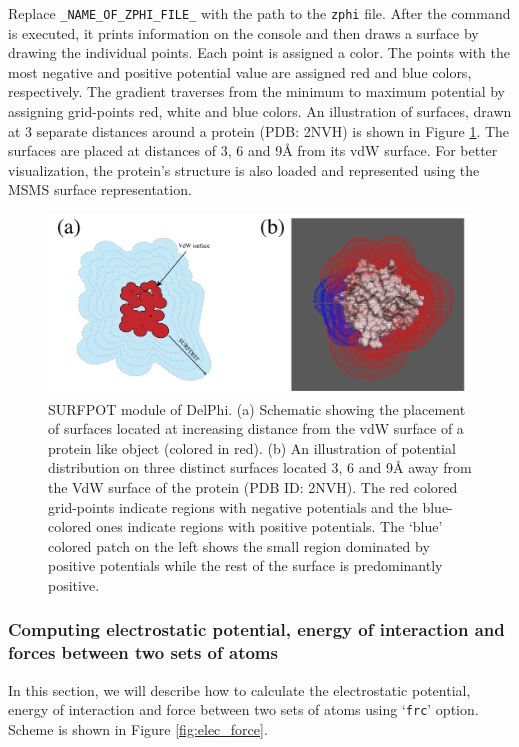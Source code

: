 \documentclass[9pt,tutorial]{livecoms}
\begin{document}
Replace \texttt{\_NAME\_OF\_ZPHI\_FILE\_} with the path to the \texttt{zphi} file. After the command is executed, it prints information on the console and then draws a surface by drawing the individual points. Each point is assigned a color. The points with the most negative and positive potential value are assigned red and blue colors, respectively. The gradient traverses from the minimum to maximum potential by assigning grid-points red, white and blue colors. An illustration of surfaces, drawn at 3 separate distances around a protein (PDB: 2NVH) is shown in Figure \ref{fig:zeta-potential}. The surfaces are placed at distances of 3, 6 and 9Å from its vdW surface. For better visualization, the protein’s structure is also loaded and represented using the MSMS surface representation. 

\begin{figure}
\includegraphics[width=0.95\linewidth]{Figure_9.png}
\caption{SURFPOT module of DelPhi. (a) Schematic showing the placement of surfaces located at increasing distance from the vdW surface of a protein like object (colored in red). (b) An illustration of potential distribution on three distinct surfaces located 3, 6 and 9Å away from the VdW surface of the protein (PDB ID: 2NVH). The red colored grid-points indicate regions with negative potentials and the blue-colored ones indicate regions with positive potentials. The ‘blue’ colored patch on the left shows the small region dominated by positive potentials while the rest of the surface is predominantly positive.}
\label{fig:zeta-potential}
\end{figure}


\subsubsection{Computing electrostatic potential, energy of interaction and forces between two sets of atoms}
In this section, we will describe how to calculate the electrostatic potential, energy of interaction and force between two sets of atoms using ‘\texttt{frc}’ option. Scheme is shown in Figure \ref{fig:elec_force}.
\end{document}
